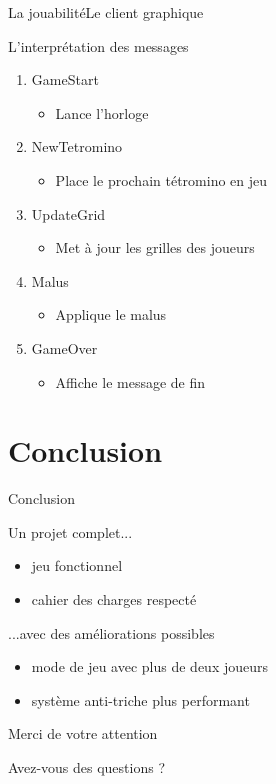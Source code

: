 \documentclass[french]{beamer}
\begin{document}
		\begin{frame}{La jouabilité}{Le client graphique}
			\begin{block}{L'interprétation des messages}				
				\begin{enumerate}
					\item GameStart
				    	\begin{itemize}
				    		\item Lance l'horloge
				    	\end{itemize}
				   	
				   	\item NewTetromino
				   		\begin{itemize}
				   			\item Place le prochain tétromino en jeu
				   		\end{itemize}

					\item UpdateGrid
				    	\begin{itemize}
				    		\item Met à jour les grilles des joueurs
				    	\end{itemize}

				    \item Malus
				    	\begin{itemize}
				    		\item Applique le malus
				    	\end{itemize}

					\item GameOver
				    	\begin{itemize}
				    		\item Affiche le message de fin
				    	\end{itemize}
				\end{enumerate}
			\end{block}
		\end{frame}

\section*{Conclusion}

		\begin{frame}{Conclusion}
			\begin{block}{Un projet complet...}
				\begin{itemize}
					\item jeu fonctionnel
					\item cahier des charges respecté
				\end{itemize}
			\end{block}

			\begin{block}{...avec des améliorations possibles}
				\begin{itemize}
					\item mode de jeu avec plus de deux joueurs
					\item système anti-triche plus performant
				\end{itemize}
			\end{block}
		\end{frame}

		\begin{frame}{Merci de votre attention}
			\begin{center}
				\Large{Avez-vous des questions ?}
			\end{center}
		\end{frame}




	
\end{document}
